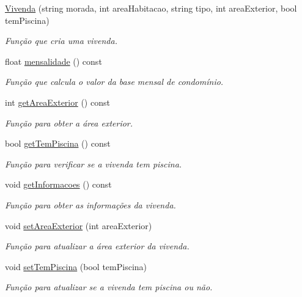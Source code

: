 \begin{DoxyCompactItemize}
\item 
\hyperlink{class_vivenda_a3db5bb725879896c7a1e64ea4eee1495}{Vivenda} (string morada, int area\+Habitacao, string tipo, int area\+Exterior, bool tem\+Piscina)
\begin{DoxyCompactList}\small\item\em Função que cria uma vivenda. \end{DoxyCompactList}\item 
float \hyperlink{class_vivenda_ad542e2b2f31da8c24b706211efc880d8}{mensalidade} () const 
\begin{DoxyCompactList}\small\item\em Função que calcula o valor da base mensal de condomínio. \end{DoxyCompactList}\item 
int \hyperlink{class_vivenda_a28bc8d025d1fd0da9a49dc73d34165ef}{get\+Area\+Exterior} () const 
\begin{DoxyCompactList}\small\item\em Função para obter a área exterior. \end{DoxyCompactList}\item 
bool \hyperlink{class_vivenda_aa65508502441fffa1efa69e8708ecc85}{get\+Tem\+Piscina} () const 
\begin{DoxyCompactList}\small\item\em Função para verificar se a vivenda tem piscina. \end{DoxyCompactList}\item 
void \hyperlink{class_vivenda_a6d00de5d5b0c62e6d65772bd01a7af2a}{get\+Informacoes} () const 
\begin{DoxyCompactList}\small\item\em Função para obter as informações da vivenda. \end{DoxyCompactList}\item 
void \hyperlink{class_vivenda_a78aade265c5cbaaa300c46b248b4e977}{set\+Area\+Exterior} (int area\+Exterior)
\begin{DoxyCompactList}\small\item\em Função para atualizar a área exterior da vivenda. \end{DoxyCompactList}\item 
void \hyperlink{class_vivenda_aad5c1d4f93acd1b96bc652d04a76a029}{set\+Tem\+Piscina} (bool tem\+Piscina)
\begin{DoxyCompactList}\small\item\em Função para atualizar se a vivenda tem piscina ou não. \end{DoxyCompactList}\end{DoxyCompactItemize}


